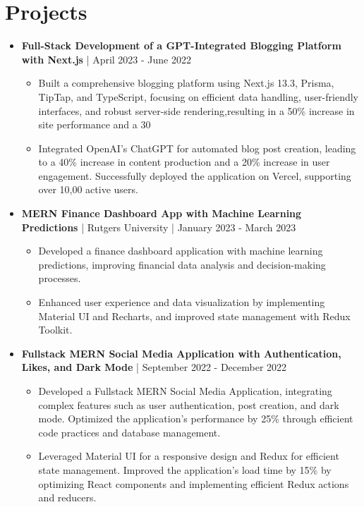 \documentclass[letterpaper, 9pt]{extarticle}
\begin{document}
\section{Projects}
\begin{itemize}[leftmargin=*]
\item \textbf{Full-Stack Development of a GPT-Integrated Blogging Platform with Next.js} | April 2023 - June 2022 

\begin{itemize}
\item Built a comprehensive blogging platform using Next.js 13.3, Prisma, TipTap, and TypeScript, focusing on efficient data handling, user-friendly interfaces, and robust server-side rendering,resulting in a 50\% increase in site performance and a 30%
\item  Integrated OpenAI's ChatGPT for automated blog post creation, leading to a 40\% increase in content production and a 20\% increase in user engagement. Successfully deployed the application on Vercel, supporting over 10,00 active users.
\end{itemize}

\item \textbf{MERN Finance Dashboard App with Machine Learning Predictions} | Rutgers University | January 2023 - March 2023 

\begin{itemize}
\item Developed a finance dashboard application with machine learning predictions, improving financial data analysis and decision-making processes.
\item Enhanced user experience and data visualization by implementing Material UI and Recharts, and improved state management with Redux Toolkit.
\end{itemize}

\item \textbf{Fullstack MERN Social Media Application with Authentication, Likes, and Dark Mode} | September 2022 - December 2022 

\begin{itemize}
\item Developed a Fullstack MERN Social Media Application, integrating complex features such as user authentication, post creation, and dark mode. Optimized the application's performance by 25\% through efficient code practices and database management.
\item Leveraged Material UI for a responsive design and Redux for efficient state management. Improved the application's load time by 15\% by optimizing React components and implementing efficient Redux actions and reducers.
\end{itemize}
\end{itemize}
\end{document}

